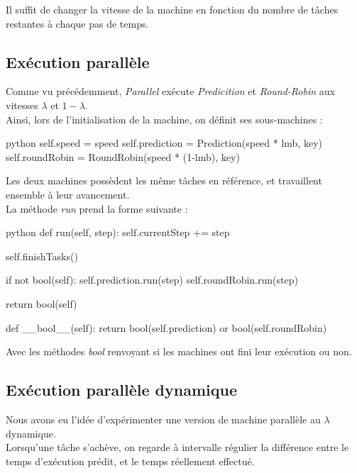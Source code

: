 \documentclass[12pt]{article}
\begin{document}
Il suffit de changer la vitesse de la machine en fonction du nombre de tâches restantes à chaque pas de temps.

\subsection{Exécution parallèle}

Comme vu précédemment, \emph{Parallel} exécute \emph{Predicition} et \emph{Round-Robin} aux vitesses $\lambda$ et $1 - \lambda$. \\

Ainsi, lors de l'initialisation de la machine, on définit ses sous-machines :
\begin{mintedbox}{python}
        self.speed = speed
        self.prediction = Prediction(speed * lmb, key)
        self.roundRobin = RoundRobin(speed * (1-lmb), key)
\end{mintedbox}

Les deux machines possèdent les même tâches en référence, et travaillent ensemble à leur avancement. \\

La méthode \emph{run} prend la forme suivante :
\begin{mintedbox}{python}
    def run(self, step):
        self.currentStep += step

        self.finishTasks()

        if not bool(self):
            self.prediction.run(step)
            self.roundRobin.run(step)

        return bool(self)
        
    def __bool__(self):
        return bool(self.prediction) or bool(self.roundRobin)
\end{mintedbox}

Avec les méthodes \emph{bool} renvoyant si les machines ont fini leur exécution ou non.

\subsection{Exécution parallèle dynamique}

Nous avons eu l'idée d'expérimenter une version de machine parallèle au $\lambda$ dynamique. \\

Lorsqu'une tâche s'achève, on regarde à intervalle régulier la différence entre le temps d'exécution prédit, et le temps réellement effectué. \\
\end{document}
